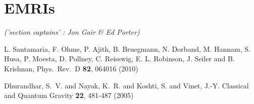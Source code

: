 \documentclass{iopart}
\begin{document}
\section{EMRIs}
{\it ('section captains' : Jon Gair \& Ed Porter) }

























\begin{thebibliography}{}

L. Santamaria, F. Ohme, P. Ajith, B. Bruegmann, N. Dorband, M. Hannam, S. Husa, P. Moesta, D. Pollney, C. Reisswig, E. L. Robinson, J. Seiler and B. Krishnan,  Phys.\ Rev.\  D {\bf 82}, 064016 (2010)

{Dhurandhar}, S.~V. and {Nayak}, K.~R. and {Koshti}, S. and {Vinet}, J.-Y. Classical and Quantum Gravity {\bf 22}, 481-487 (2005)

\end{thebibliography}{}
\end{document}
